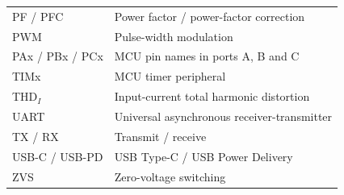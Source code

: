 \begin{longtable}{@{}L{0.23\textwidth}L{0.69\textwidth}@{}}
PF / PFC & Power factor / power-factor correction\\
PWM & Pulse-width modulation\\
PAx / PBx / PCx & MCU pin names in ports A, B and C\\
TIMx & MCU timer peripheral\\
THD\(_I\) & Input-current total harmonic distortion\\
UART & Universal asynchronous receiver-transmitter\\
TX / RX & Transmit / receive\\
USB-C / USB-PD & USB Type-C / USB Power Delivery\\
ZVS & Zero-voltage switching\\
\bottomrule
\end{longtable}
